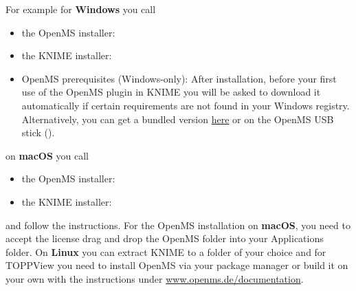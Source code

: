 For example for \textbf{Windows} you call
\begin{itemize}
  \item the OpenMS installer: \directory{\WindowsOpenMSInstallerName}
  \item the KNIME installer:  \directory{\WindowsKnimeInstallerName}
  \item OpenMS prerequisites (Windows-only): After installation, before your first use of the OpenMS plugin in KNIME you will be asked to download it automatically if certain requirements are not found in your Windows registry. Alternatively, you can get a bundled version \href{\WindowsPrerequisitesLink}{here} or on the OpenMS USB stick (\directory{\WindowsOpenMSPrereqInstallerName}).
\end{itemize}

on \textbf{macOS} you call
\begin{itemize}
  \item the OpenMS installer: \directory{\MacOpenMSInstallerName}
  \item the KNIME installer: \directory{\MacKnimeInstallerName}
\end{itemize}

and follow the instructions. For the OpenMS installation on \textbf{macOS}, you need to accept the license drag and drop the OpenMS folder into your Applications folder.
 On \textbf{Linux} you can extract KNIME to a folder of your choice and for TOPPView you need to install OpenMS via your package manager or build it on your own with the instructions under \href{https://www.openms.de/documentation}{www.openms.de/documentation}.

